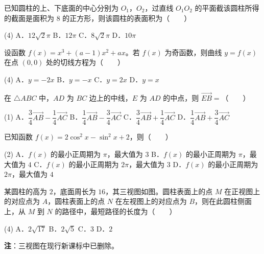 已知圆柱的上、下底面的中心分别为 $O_1$，$O_2$，过直线 $O_1O_2$ 的平面截该圆柱所得的截面是面积为 $8$ 的正方形，则该圆柱的表面积为（　　）

\begin{gkopts}(4)
\task A．$12\sqrt2\pi$
\task B．$12\pi$
\task C．$8\sqrt2\pi$
\task D．$10\pi$
\end{gkopts}

设函数 $f(x)=x^{3}+(a-1)x^{2}+ax$。若 $f(x)$ 为奇函数，则曲线 $y=f(x)$ 在点 $(0,0)$ 处的切线方程为（　　）

\begin{gkopts}(4)
\task A．$y=-2x$
\task B．$y=-x$
\task C．$y=2x$
\task D．$y=x$
\end{gkopts}

在 $\triangle ABC$ 中，$AD$ 为 $BC$ 边上的中线，$E$ 为 $AD$ 的中点，则 $\overrightarrow{EB}=$（　　）

\begin{gkopts}(1)
\task A．$\dfrac34\overrightarrow{AB}-\dfrac14\overrightarrow{AC}$
\task B．$\dfrac14\overrightarrow{AB}-\dfrac34\overrightarrow{AC}$
\task C．$\dfrac34\overrightarrow{AB}+\dfrac14\overrightarrow{AC}$
\task D．$\dfrac14\overrightarrow{AB}+\dfrac34\overrightarrow{AC}$
\end{gkopts}

已知函数 $f(x)=2\cos^{2}x-\sin^{2}x+2$，则（　　）

\begin{gkopts}(2)
\task A．$f(x)$ 的最小正周期为 $\pi$，最大值为 $3$
\task B．$f(x)$ 的最小正周期为 $\pi$，最大值为 $4$
\task C．$f(x)$ 的最小正周期为 $2\pi$，最大值为 $3$
\task D．$f(x)$ 的最小正周期为 $2\pi$，最大值为 $4$
\end{gkopts}

某圆柱的高为 $2$，底面周长为 $16$，其三视图如图。圆柱表面上的点 $M$ 在正视图上的对应点为 $A$，圆柱表面上的点 $N$ 在左视图上的对应点为 $B$，则在此圆柱侧面上，从 $M$ 到 $N$ 的路径中，最短路径的长度为（　　）

\begin{center}\end{center}

\begin{gkopts}(4)
\task A．$2\sqrt{17}$
\task B．$2\sqrt5$
\task C．$3$
\task D．$2$
\end{gkopts}

\begin{gktip}
\textbf{注}：三视图在现行新课标中已删除。
\end{gktip}

